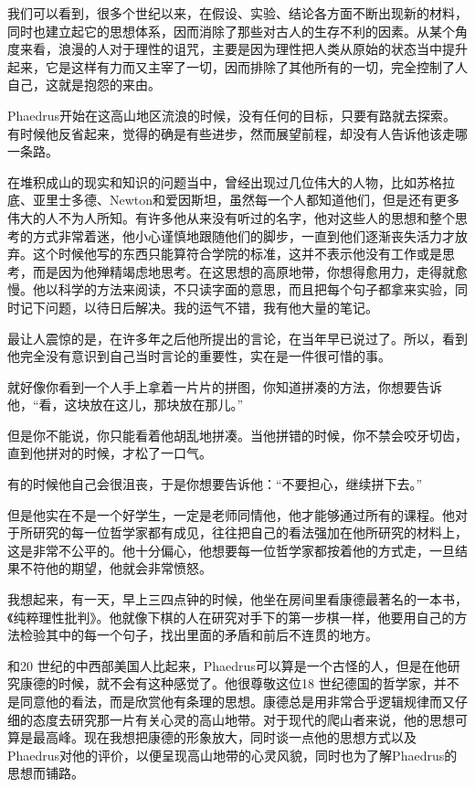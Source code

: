 \documentclass[UTF8]{article}
\begin{document}
\par 我们可以看到，很多个世纪以来，在假设、实验、结论各方面不断出现新的材料，同时也建立起它的思想体系，因而消除了那些对古人的生存不利的因素。从某个角度来看，浪漫的人对于理性的诅咒，主要是因为理性把人类从原始的状态当中提升起来，它是这样有力而又主宰了一切，因而排除了其他所有的一切，完全控制了人自己，这就是抱怨的来由。
\par Phaedrus开始在这高山地区流浪的时候，没有任何的目标，只要有路就去探索。有时候他反省起来，觉得的确是有些进步，然而展望前程，却没有人告诉他该走哪一条路。
\par 在堆积成山的现实和知识的问题当中，曾经出现过几位伟大的人物，比如苏格拉底、亚里士多德、Newton和爱因斯坦，虽然每一个人都知道他们，但是还有更多伟大的人不为人所知。有许多他从来没有听过的名字，他对这些人的思想和整个思考的方式非常着迷，他小心谨慎地跟随他们的脚步，一直到他们逐渐丧失活力才放弃。这个时候他写的东西只能算符合学院的标准，这并不表示他没有工作或是思考，而是因为他殚精竭虑地思考。在这思想的高原地带，你想得愈用力，走得就愈慢。他以科学的方法来阅读，不只读字面的意思，而且把每个句子都拿来实验，同时记下问题，以待日后解决。我的运气不错，我有他大量的笔记。
\par 最让人震惊的是，在许多年之后他所提出的言论，在当年早已说过了。所以，看到他完全没有意识到自己当时言论的重要性，实在是一件很可惜的事。
\par 就好像你看到一个人手上拿着一片片的拼图，你知道拼凑的方法，你想要告诉他，“看，这块放在这儿，那块放在那儿。”
\par 但是你不能说，你只能看着他胡乱地拼凑。当他拼错的时候，你不禁会咬牙切齿，直到他拼对的时候，才松了一口气。
\par 有的时候他自己会很沮丧，于是你想要告诉他：“不要担心，继续拼下去。”
\par 但是他实在不是一个好学生，一定是老师同情他，他才能够通过所有的课程。他对于所研究的每一位哲学家都有成见，往往把自己的看法强加在他所研究的材料上，这是非常不公平的。他十分偏心，他想要每一位哲学家都按着他的方式走，一旦结果不符他的期望，他就会非常愤怒。
\par 我想起来，有一天，早上三四点钟的时候，他坐在房间里看康德最著名的一本书，《纯粹理性批判》。他就像下棋的人在研究对手下的第一步棋一样，他要用自己的方法检验其中的每一个句子，找出里面的矛盾和前后不连贯的地方。
\par 和20 世纪的中西部美国人比起来，Phaedrus可以算是一个古怪的人，但是在他研究康德的时候，就不会有这种感觉了。他很尊敬这位18 世纪德国的哲学家，并不是同意他的看法，而是欣赏他有条理的思想。康德总是用非常合乎逻辑规律而又仔细的态度去研究那一片有关心灵的高山地带。对于现代的爬山者来说，他的思想可算是最高峰。现在我想把康德的形象放大，同时谈一点他的思想方式以及Phaedrus对他的评价，以便呈现高山地带的心灵风貌，同时也为了解Phaedrus的思想而铺路。
\end{document}
